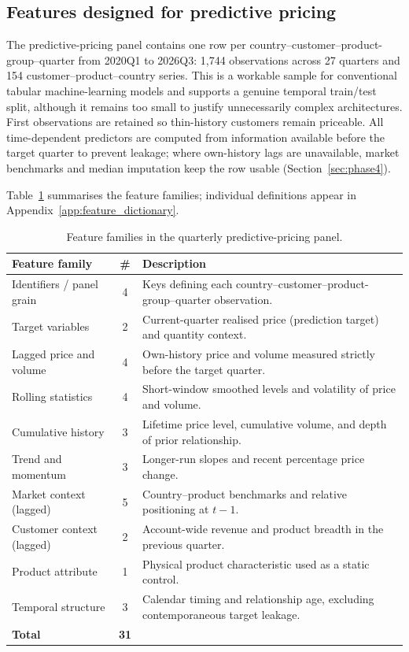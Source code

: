 \documentclass{article}
\begin{document}
\subsection{Features designed for predictive pricing}

The predictive-pricing panel contains one row per country--customer--product-group--quarter from 2020Q1 to 2026Q3: 1{,}744 observations across 27 quarters and 154 customer--product--country series. This is a workable sample for conventional tabular machine-learning models and supports a genuine temporal train/test split, although it remains too small to justify unnecessarily complex architectures. First observations are retained so thin-history customers remain priceable. All time-dependent predictors are computed from information available before the target quarter to prevent leakage; where own-history lags are unavailable, market benchmarks and median imputation keep the row usable (Section~\ref{sec:phase4}).

Table~\ref{tab:phase2_panel_families} summarises the feature families; individual definitions appear in Appendix~\ref{app:feature_dictionary}.

\begin{table}[H]
\centering
\small
\begin{tabular}{@{}p{3.6cm}c p{7.6cm}@{}}
\toprule
\textbf{Feature family} & \textbf{\#} & \textbf{Description} \\
\midrule
Identifiers / panel grain & 4 & Keys defining each country--customer--product-group--quarter observation. \\
Target variables & 2 & Current-quarter realised price (prediction target) and quantity context. \\
Lagged price and volume & 4 & Own-history price and volume measured strictly before the target quarter. \\
Rolling statistics & 4 & Short-window smoothed levels and volatility of price and volume. \\
Cumulative history & 3 & Lifetime price level, cumulative volume, and depth of prior relationship. \\
Trend and momentum & 3 & Longer-run slopes and recent percentage price change. \\
Market context (lagged) & 5 & Country--product benchmarks and relative positioning at $t{-}1$. \\
Customer context (lagged) & 2 & Account-wide revenue and product breadth in the previous quarter. \\
Product attribute & 1 & Physical product characteristic used as a static control. \\
Temporal structure & 3 & Calendar timing and relationship age, excluding contemporaneous target leakage. \\
\midrule
\textbf{Total} & \textbf{31} & \\
\bottomrule
\end{tabular}
\caption{Feature families in the quarterly predictive-pricing panel.}
\label{tab:phase2_panel_families}
\end{table}
\end{document}
